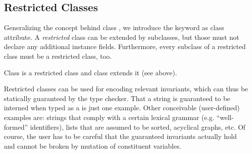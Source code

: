 \subsection{Restricted Classes}
Generalizing the concept behind class , we introduce the keyword
 as class attribute. A {\em restricted} class can be extended
by subclasses, but those must not declare any additional instance fields.
Furthermore, every subclass of a restricted class must be a restricted class,
too.

Class  is a restricted class and class  extends it
(see above).

Restricted classes can be used for encoding relevant invariants, which can thus
be statically guaranteed by the type checker. That a string is guaranteed to be
interned when typed as a  is just one example. Other conceivable
(user-defined) examples are: strings that comply with a certain lexical grammar
(e.g. ``well-formed'' identifiers), lists that are assumed to be sorted,
acyclical graphs, etc. Of course, the user has to be careful that the guaranteed
invariants actually hold and cannot be broken by mutation of constituent
variables.

